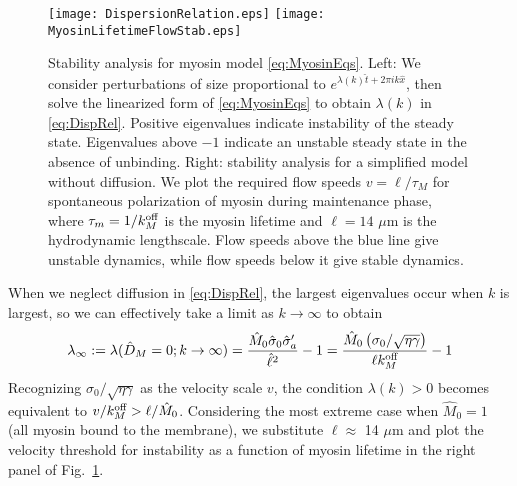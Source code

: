 \documentclass[11pt]{article}
\newcommand{\6}[1]{#1_{\text{6}}}
\newcommand{\3}[1]{#1_{\text{3}}}
\begin{document}
\begin{figure}
\centering
\texttt{[image: DispersionRelation.eps]}
\texttt{[image: MyosinLifetimeFlowStab.eps]}
\caption{\label{fig:DispRelMy} Stability analysis for myosin model \eqref{eq:MyosinEqs}. Left: We consider perturbations of size proportional to $e^{\lambda(k) \hat{t}+2 \pi i k \hat{x}}$, then solve the linearized form of \eqref{eq:MyosinEqs} to obtain $\lambda(k)$ in \eqref{eq:DispRel}. Positive eigenvalues indicate instability of the steady state. Eigenvalues above $-1$ indicate an unstable steady state in the absence of unbinding. Right: stability analysis for a simplified model without diffusion. We plot the required flow speeds $v= \ell/\tau_M$ for spontaneous polarization of myosin during maintenance phase, where $\tau_m=1/k^\text{off}_M$ is the myosin lifetime and $\ell=14$ $\mu$m is the hydrodynamic lengthscale. Flow speeds above the blue line give unstable dynamics, while flow speeds below it give stable dynamics. }
\end{figure}


When we neglect diffusion in \eqref{eq:DispRel}, the largest eigenvalues occur when $k$ is largest, so we can effectively take a limit as $k \rightarrow \infty$ to obtain 
\begin{equation}
\label{eq:DispRel}
\lambda_\infty:=\lambda(\hat D_M=0; k\rightarrow \infty) =\frac{\hat M_0 \hat \sigma_0 \hat \sigma_a'}{\hat \ell^2}-1 = \frac{\hat M_0 \left(\sigma_0/\sqrt{\eta \gamma}\right)}{\ell k^\text{off}_M}-1
\end{equation}
Recognizing $\sigma_0/\sqrt{\eta \gamma}$ as the velocity scale $v$, the condition $\lambda(k) > 0$ becomes equivalent to $v/k^\text{off}_M > \ell/\hat M_0$. Considering the most extreme case when $\hat M_0=1$ (all myosin bound to the membrane), we substitute $\ell \approx$ 14 $\mu$m and plot the velocity threshold for instability as a function of myosin lifetime in the right panel of Fig.\ \ref{fig:DispRelMy}. 

\newpage
\end{document}
